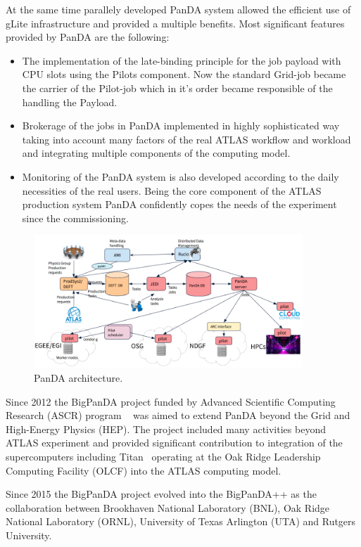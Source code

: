 \documentclass{webofc}
\begin{document}
At the same time parallely developed PanDA system allowed the efficient use of gLite infrastructure and provided a multiple benefits. Most significant features provided by PanDA are the following: 

\begin{itemize}
	\item The implementation of the late-binding principle for the job payload with CPU slots using the Pilots component. Now the standard Grid-job became the carrier of the Pilot-job which in it’s order became responsible of the handling the Payload. 
	\item Brokerage of the jobs in PanDA implemented in highly sophisticated way taking into account many factors of the real ATLAS workflow and workload and integrating multiple components of the computing model. 
	\item Monitoring of the PanDA system is also developed according to the daily necessities of the real users. Being the core component of the ATLAS production system PanDA confidently copes the needs of the experiment since the commissioning. 
\end{itemize}

\begin{figure}
	\centering
	\includegraphics[width=0.90\textwidth]{figures/PanDA_architecture.png}
	\caption{PanDA architecture.}
	\label{fig:panda-arch}
\end{figure}

Since 2012 the BigPanDA project funded by Advanced Scientific Computing Research (ASCR) program ~\cite{DOEASCR} was aimed to extend PanDA beyond the Grid and High-Energy Physics (HEP). The project included many activities beyond ATLAS experiment and provided significant contribution to integration of the supercomputers including Titan~\cite{Titan} operating at the Oak Ridge Leadership Computing Facility (OLCF) into the ATLAS computing model. 

Since 2015 the BigPanDA project evolved into the  BigPanDA++ as the collaboration between Brookhaven National Laboratory (BNL), Oak Ridge National Laboratory (ORNL),  University of Texas Arlington (UTA) and Rutgers University.
\end{document}

